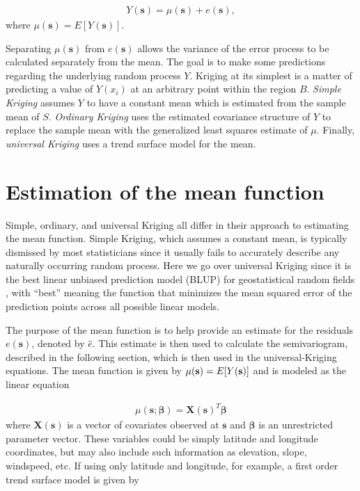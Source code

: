 \documentclass[12pt,twoside]{reedthesis}
\begin{document}
\begin{align*}
Y(\mathbf{s}) = \mu(\mathbf{s}) + e(\mathbf{s}),
\end{align*} 
where $\mu(\mathbf{s}) = E[Y(\mathbf{s})]$.
  

Separating $\mu(\mathbf{s})$ from $e(\mathbf{s})$ allows the variance of the error process to be calculated separately from the mean. The goal is to make some predictions regarding the underlying random process $Y$. Kriging at its simplest is a matter of predicting a value of $Y(x_i)$ at an arbitrary point within the region $B$. \emph{Simple Kriging} assumes $Y$ to have a constant mean which is estimated from the sample mean of $S$. \emph{Ordinary Kriging} uses the estimated covariance structure of $Y$ to replace the sample mean with the generalized least squares estimate of $\mu$. Finally, \emph{universal Kriging} uses a trend surface model for the mean. 

\section{Estimation of the mean function}

Simple, ordinary, and universal Kriging all differ in their approach to estimating the mean function. Simple Kriging, which assumes a constant mean, is typically dismissed by most statisticians since it usually fails to accurately describe any naturally occurring random process. Here we go over universal Kriging since it is the best linear unbiased prediction model (BLUP) for geostatistical random fields \cite{gelfand:2010}, with ``best'' meaning the function that minimizes the mean squared error of the prediction points across all possible linear models. 

The purpose of the mean function is to help provide an estimate for the residuals $e(\mathbf{s})$, denoted by $\hat e$. This estimate is then used to calculate the semivariogram, described in the following section, which is then used in the universal-Kriging equations. The mean function is given by $\mu(\mathbf{s}) = E[Y(\bold{s})]$ and is modeled as the linear equation

\begin{align*}
\mu(\mathbf{s}; \boldsymbol{\beta}) = \mathbf{X}(\mathbf{s})^T \boldsymbol{\beta}
\end{align*} 
where $\mathbf{X}(\mathbf{s})$ is a vector of covariates observed at $\mathbf{s}$ and $\mathbf{\beta}$ is an unrestricted parameter vector. These variables could be simply latitude and longitude coordinates, but may also include such information as elevation, slope, windspeed, etc. If using only latitude and longitude, for example, a first order  trend surface model is given by
\end{document}
